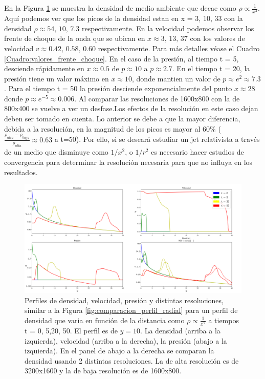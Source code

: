 \documentclass[12pt,a4paper]{book}
\begin{document}
En la Figura \ref{fig:Decaimiento_cuadratico_densidad_jet} se muestra la densidad de medio ambiente 
que decae como $\rho \varpropto \frac{1}{x^2}$. Aquí podemos ver que los  picos de la densidad estan en
x = 3, 10, 33 con  la densidad $\rho \approx 54, \,  10, \,  7.3$ 
respectivamente. En la velocidad podemos observar
los frente de choque de la onda que se ubican en $x \approx 3, \, 13, \, 37$ con los valores de velocidad
$v \approx 0.42, \, 0.58, \, 0.60$ respectivamente. Para más detalles véase el Cuadro \ref{Cuadro:valores_frente_choque}.
En el caso de la presión, al tiempo t = 5, desciende rápidamente en $x \approx 0.5$ de 
$p  \approx 10$ a $p  \approx 2.7$.
En el tiempo t = 20, la presión tiene un valor máximo en $x \approx 10$, 
donde mantien un valor  de 
$p \approx e^2 \approx 7.3$. Para el tiempo t = 50
la presión desciende exponencialmente del punto $x \approx 28$ donde $p \approx e^{-5} \approx 0.006$.
Al comparar las resoluciones de 1600x800 con la de 800x400 se vuelve a ver un desfase.Los efectos de la resolución 
en este caso dejan deben ser tomado en cuenta. Lo anterior se debe a que la mayor diferencia, debida a la resolución, 
en la magnitud de los picos es mayor al 60\% ($\frac{\rho_{alta} - \rho_{baja}}{\rho_{alta}} \approx 0.63$ a t=50). 
Por ello, si se deseará estudiar un jet relativista a través de un medio que disminuye como $1/x^2$, o $1/r^2$ es 
necesario hacer estudios de convergencia para determinar la resolución necesaria para que no influya en los resultados. 

\begin{figure}
  \centering
  \includegraphics[width = 1.0\textwidth]{./Figuras/jet/perfiles/perfiles_cuadraticos.png}
  \caption{Perfiles de densidad, velocidad, presión y distintas resoluciones, similar a la Figura 
  \ref{fig:comparacion_perfil_radial} para un perfil de densidad que varia en función de la distancia como
  $\rho \varpropto \frac{1}{x^2}$ a tiempos t = 0, 5,20, 50.
  El perfil es de $y = 10$.
  La densidad (arriba a la izquierda), velocidad (arriba a la derecha), la presión (abajo a la izquierda). 
  En el panel de abajo a la derecha se comparan la densidad usando 2 distintas resoluciones. La de alta resolución
  es de 3200x1600 y la de baja resolución es de 1600x800.}\label{fig:Decaimiento_cuadratico_densidad_jet}
\end{figure}
\end{document}
